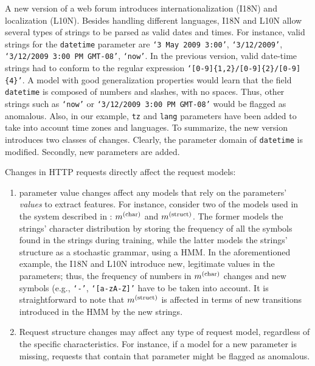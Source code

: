 \begin{example}
  A new version of a web forum introduces internationalization (I18N) and localization (L10N). Besides handling different languages, I18N and L10N allow several types of strings to be parsed as valid dates and times. For instance, valid strings for the \texttt{datetime} parameter are \texttt{`3 May 2009 3:00'}, \texttt{`3/12/2009'}, \texttt{`3/12/2009 3:00 PM GMT-08'}, \texttt{`now'}. In the previous version, valid date-time strings had to conform to the regular expression \texttt{`[0-9]\{1,2\}/[0-9]\{2\}/[0-9]\{4\}'}. A model with good generalization properties would learn that the field \texttt{datetime} is composed of numbers and slashes, with no spaces. Thus, other strings such as \texttt{`now'} or \texttt{`3/12/2009 3:00 PM GMT-08'} would be flagged as anomalous. Also, in our example, \texttt{tz} and \texttt{lang} parameters have been added to take into account time zones and languages. To summarize, the new version introduces two classes of changes. Clearly, the parameter domain of \texttt{datetime} is modified. Secondly, new parameters are added.
\end{example}

Changes in \ac{HTTP} requests directly affect the request models:

\begin{enumerate}
\item parameter value changes affect any models that rely on the parameters' \emph{values} to extract features. For instance, consider two of the models used in the system described in \citep{kruegel:jcn2005:webanomaly}: $m^{\left(\text{char}\right)}$ and $m^{\left(\text{struct}\right)}$. The former models the strings' character distribution by storing the frequency of all the symbols found in the strings during training, while the latter models the strings' structure as a stochastic grammar, using a \ac{HMM}. In the aforementioned example, the I18N and L10N introduce new, legitimate values in the parameters; thus, the frequency of numbers in $m^{\left(\text{char}\right)}$ changes and new symbols (e.g., \texttt{`-'}, \texttt{`[a-zA-Z]'} have to be taken into account. It is straightforward to note that $m^{\left(\text{struct}\right)}$ is affected in terms of new transitions introduced in the \ac{HMM} by the new strings.

\item Request structure changes may affect any type of request model, regardless of the specific characteristics. For instance, if a model for a new parameter is missing, requests that contain that parameter might be flagged as anomalous.
\end{enumerate}

